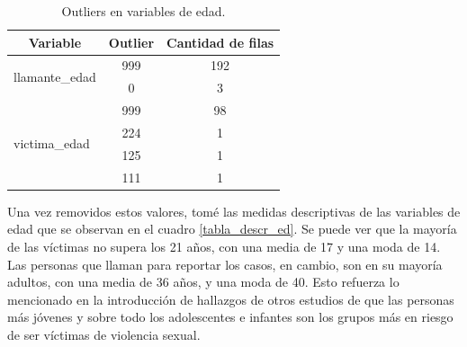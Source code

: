 \documentclass[10 pt]{article}
\begin{document}
\begin{table}[H]
    \centering
    \caption{Outliers en variables de edad.}
    \label{tabla_out}
    \begin{tabular}{lcc}
    \hline
    \multicolumn{1}{c}{\textbf{Variable}} & \textbf{Outlier} & \textbf{Cantidad de filas} \\ \hline
    \multirow{2}{*}{llamante\_edad}       & 999              & 192                        \\
                                          & 0                & 3                          \\ \hline
    \multirow{4}{*}{victima\_edad}        & 999              & 98                         \\
                                          & 224              & 1                          \\
                                          & 125              & 1                          \\
                                          & 111              & 1                          \\ \hline
    \end{tabular}
    \end{table}


Una vez removidos estos valores, tomé las medidas descriptivas de las variables de edad que se observan en el cuadro \ref{tabla_descr_ed}. Se puede ver que la mayoría de las víctimas no supera los 21 años, con una media de 17 y una moda de 14. Las personas que llaman para reportar los casos, en cambio, son en su mayoría adultos, con una media de 36 años, y una moda de 40. Esto refuerza lo mencionado en la introducción de hallazgos de otros estudios de que las personas más jóvenes y sobre todo los adolescentes e infantes son los grupos más en riesgo de ser víctimas de violencia sexual. 
\end{document}
